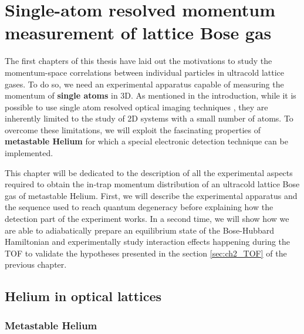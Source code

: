 


\chapter{Single-atom resolved momentum measurement of lattice Bose gas}

\label{sec:chapter_3}

The first chapters of this thesis have laid out the motivations to study the momentum-space correlations between individual particles in ultracold lattice gases. To do so, we need an experimental apparatus capable of measuring the momentum of \textbf{single atoms} in 3D. As mentioned in the introduction, while it is possible to use single atom resolved optical imaging techniques \cite{bucker2009single,serwane2011deterministic}, they are inherently limited to the study of 2D systems with a small number of atoms. To overcome these limitations, we will exploit the fascinating properties of \textbf{metastable Helium} for which a special electronic detection technique can be implemented.


This chapter will be dedicated to the description of all the experimental aspects required to obtain the in-trap momentum distribution of an ultracold lattice Bose gas of metastable Helium. First, we will describe the experimental apparatus and the sequence used to reach quantum degeneracy before explaining how the detection part of the experiment works. In a second time, we will show how we are able to adiabatically prepare an equilibrium state of the Bose-Hubbard Hamiltonian and experimentally study interaction effects happening during the TOF to validate the hypotheses presented in the section \ref{sec:ch2_TOF} of the previous chapter.




\section{Helium in optical lattices}

\subsection{Metastable Helium}

